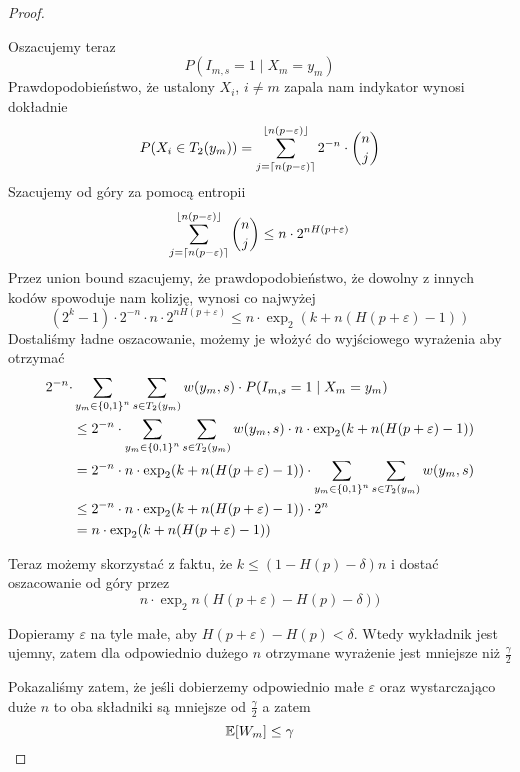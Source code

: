 \begin{proof}
\begin{enumerate}
        Oszacujemy teraz 
        \[
            P(I_{m, s} = 1 \mid X_m = y_m)
        \]
        Prawdopodobieństwo, że ustalony \( X_i \), \( i \neq m \) zapala nam indykator wynosi dokładnie
        \[
            P(X_i \in T_2(y_m)) = \sum_{j = \left\lceil n(p-\varepsilon)\right\rceil}^{\left\lfloor n(p-\varepsilon)\right\rfloor} 2^{-n} \cdot \binom{n}{j}
        \]
        Szacujemy od góry za pomocą entropii
        \[
            \sum_{j=\left\lceil n(p-\varepsilon)\right\rceil}^{\left\lfloor n(p-\varepsilon)\right\rfloor} \binom{n}{j}
            \leq n\cdot 2^{nH(p+\varepsilon)}
        \]
        Przez union bound szacujemy, że prawdopodobieństwo, że dowolny z innych kodów spowoduje nam kolizję, wynosi co najwyżej
        \[
            (2^k-1) \cdot 2^{-n} \cdot n \cdot 2^{nH(p+\varepsilon)}
            \leq n\cdot\exp_2(k + n(H(p + \varepsilon) - 1))
        \]
        Dostaliśmy ładne oszacowanie, możemy je włożyć do wyjściowego wyrażenia aby otrzymać
        \begin{align*}
            2^{-n} \cdot &\sum_{y_m \in \set{0, 1}^n} \sum_{s \in T_2(y_m)} w(y_m, s) \cdot P(I_{m, s} = 1 \mid X_m = y_m) \\
            &\leq 2^{-n}\cdot \sum_{y_m \in \set{0, 1}^n} \sum_{s \in T_2(y_m)} w(y_m, s) \cdot n\cdot \exp_2(k + n(H(p + \varepsilon) - 1)) \\
            &=2^{-n} \cdot  n\cdot \exp_2(k + n(H(p + \varepsilon) - 1)) \cdot \sum_{y_m \in \set{0, 1}^n} \sum_{s \in T_2(y_m)} w(y_m, s) \\
            &\leq 2^{-n} \cdot  n\cdot \exp_2(k + n(H(p + \varepsilon) - 1)) \cdot 2^n \\
            &=n\cdot \exp_2(k + n(H(p + \varepsilon) - 1))
        \end{align*}
        
        Teraz możemy skorzystać z faktu, że \( k \leq (1 - H(p) - \delta) n \)
        i dostać oszacowanie od góry przez
        \[
            n\cdot \exp_2n(H(p + \varepsilon) - H(p) - \delta))
        \]
        
        Dopieramy \( \varepsilon \) na tyle małe, aby \( H(p + \varepsilon) - H(p) < \delta \). Wtedy wykładnik jest ujemny, zatem dla odpowiednio dużego \( n \) otrzymane wyrażenie jest mniejsze niż \( \frac{\gamma}{2} \)
        
    \end{enumerate}
    Pokazaliśmy zatem, że jeśli dobierzemy odpowiednio małe \( \varepsilon \) 
    oraz wystarczająco duże \( n \)
    to oba składniki są mniejsze od \( \frac{\gamma}{2} \)
    a zatem 
    \[
        \expected{W_m} \leq \gamma
    \]
    

\end{proof}
